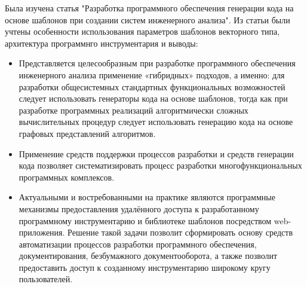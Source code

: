 \def\notedate{2022.10.02}
\def\currentauthor{Василян А.Р. (РК6-73Б)}

	Была изучена статья "Разработка программного обеспечения генерации кода на основе шаблонов при создании систем инженерного анализа". Из статьи были учтены особенности использования параметров шаблонов векторного типа, архитектура программнго инструментария и выводы:
\begin{itemize}
	\item Представляется целесообразным при разработке программного обеспечения инженерного анализа применение «гибридных» подходов, а именно: для разработки общесистемных стандартных функциональных возможностей следует использовать генераторы кода на основе шаблонов, тогда как при разработке программных реализаций алгоритмически сложных вычислительных процедур следует использовать генерацию кода на основе графовых представлений алгоритмов.
	\item Применение средств поддержки процессов разработки и средств генерации кода позволяет систематизировать процесс разработки многофункциональных программных комплексов.
	\item Актуальными и востребованными на практике являются программные механизмы предоставления удалённого доступа к разработанному программному инструментарию и библиотеке шаблонов посредством web-приложения. Решение такой задачи позволит сформировать основу средств автоматизации процессов разработки программного обеспечения, документирования, безбумажного документооборота, а также позволит предоставить доступ к созданному инструментарию широкому кругу пользователей.
\end{itemize}

\noteattributes{}

